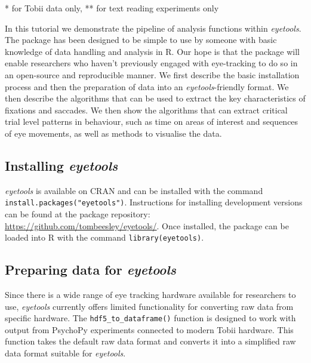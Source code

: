 \documentclass[
  man,
  floatsintext,
  longtable,
  nolmodern,
  notxfonts,
  notimes,
  colorlinks=true,linkcolor=blue,citecolor=blue,urlcolor=blue]{apa7}
\begin{document}
* for Tobii data only, ** for text reading experiments only

In this tutorial we demonstrate the pipeline of analysis functions
within \emph{eyetools}. The package has been designed to be simple to
use by someone with basic knowledge of data handling and analysis in R.
Our hope is that the package will enable researchers who haven't
previously engaged with eye-tracking to do so in an open-source and
reproducible manner. We first describe the basic installation process
and then the preparation of data into an \emph{eyetools}-friendly
format. We then describe the algorithms that can be used to extract the
key characteristics of fixations and saccades. We then show the
algorithms that can extract critical trial level patterns in behaviour,
such as time on areas of interest and sequences of eye movements, as
well as methods to visualise the data.

\subsection{\texorpdfstring{Installing
\emph{eyetools}}{Installing eyetools}}\label{installing-eyetools}

\emph{eyetools} is available on CRAN and can be installed with the
command \texttt{install.packages("eyetools")}. Instructions for
installing development versions can be found at the package repository:
\url{https://github.com/tombeesley/eyetools/}. Once installed, the
package can be loaded into R with the command
\texttt{library(eyetools)}.

\subsection{\texorpdfstring{Preparing data for
\emph{eyetools}}{Preparing data for eyetools}}\label{preparing-data-for-eyetools}

Since there is a wide range of eye tracking hardware available for
researchers to use, \emph{eyetools} currently offers limited
functionality for converting raw data from specific hardware. The
\texttt{hdf5\_to\_dataframe()} function is designed to work with output
from PsychoPy experiments connected to modern Tobii hardware. This
function takes the default raw data format and converts it into a
simplified raw data format suitable for \emph{eyetools}.
\end{document}
